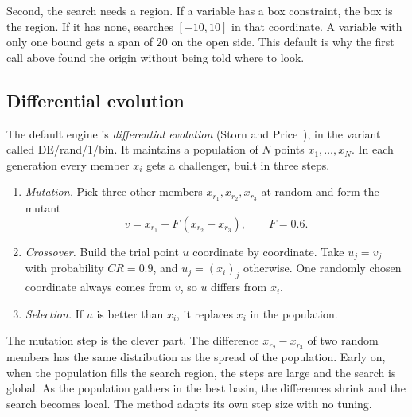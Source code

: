 Second, the search needs a region. If a variable has a box constraint, the box
is the region. If it has none,  searches \([-10, 10]\) in that
coordinate. A variable with only one bound gets a span of \(20\) on the open
side. This default is why the first call above found the origin without being
told where to look.


\subsection{Differential evolution}

The default engine is \emph{differential evolution} (Storn and Price~\cite{stornprice}), in the variant called
DE/rand/1/bin. It maintains a population of \(N\) points
\(x_1, \dots, x_N\). In each generation every member \(x_i\) gets a challenger,
built in three steps.
\begin{enumerate}
\item \emph{Mutation.} Pick three other members \(x_{r_1}, x_{r_2}, x_{r_3}\) at
random and form the mutant
\[
  v = x_{r_1} + F\,(x_{r_2} - x_{r_3}), \qquad F = 0.6 .
\]
\item \emph{Crossover.} Build the trial point \(u\) coordinate by coordinate.
Take \(u_j = v_j\) with probability \(CR = 0.9\), and \(u_j = (x_i)_j\)
otherwise. One randomly chosen coordinate always comes from \(v\), so \(u\)
differs from \(x_i\).
\item \emph{Selection.} If \(u\) is better than \(x_i\), it replaces \(x_i\) in
the population.
\end{enumerate}

The mutation step is the clever part. The difference \(x_{r_2} - x_{r_3}\) of
two random members has the same distribution as the spread of the population.
Early on, when the population fills the search region, the steps are large and
the search is global. As the population gathers in the best basin, the
differences shrink and the search becomes local. The method adapts its own step
size with no tuning.


